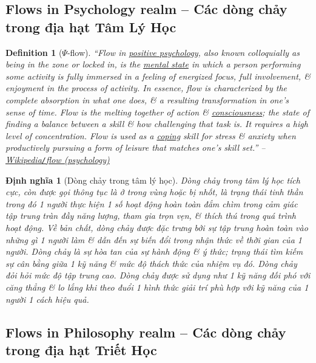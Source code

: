 \documentclass[12pt,oneside]{book}
\newtheorem{definition}{Definition}[section]
\newtheorem{dinhnghia}{Định nghĩa}[section]
\begin{document}
\subsection{Flows in Psychology realm -- Các dòng chảy trong địa hạt Tâm Lý Học}

\begin{definition}[$\Psi$-flow]
	``\emph{Flow} in \href{https://en.wikipedia.org/wiki/Positive_psychology}{positive psychology}, also known colloquially as being \emph{in the zone} or \emph{locked in}, is the \href{https://en.wikipedia.org/wiki/Mental_state}{mental state} in which a person performing some activity is fully immersed in a feeling of energized focus, full involvement, \& enjoyment in the process of activity. In essence, flow is characterized by the complete absorption in what one does, \& a resulting transformation in one's sense of time. Flow is the melting together of action \& \href{https://en.wikipedia.org/wiki/Consciousness}{consciousness}; the state of finding a balance between a skill \& how challenging that task is. It requires a high level of concentration. Flow is used as a \href{https://en.wikipedia.org/wiki/Coping}{coping} skill for stress \& anxiety when productively pursuing a form of leisure  that matches one's skill set.'' -- \href{https://en.wikipedia.org/wiki/Flow_(psychology)}{Wikipedia{\tt/}flow (psychology)}
\end{definition}

\begin{dinhnghia}[Dòng chảy trong tâm lý học]
	\emph{Dòng chảy} trong tâm lý học tích cực, còn được gọi thông tục là \emph{ở trong vùng} hoặc \emph{bị nhốt}, là trạng thái tinh thần trong đó 1 người thực hiện 1 số hoạt động hoàn toàn đắm chìm trong cảm giác tập trung tràn đầy năng lượng, tham gia trọn vẹn, \& thích thú trong quá trình hoạt động. Về bản chất, dòng chảy được đặc trưng bởi sự tập trung hoàn toàn vào những gì 1 người làm \& dẫn đến sự biến đổi trong nhận thức về thời gian của 1 người. Dòng chảy là sự hòa tan của sự hành động \& ý thức; trạng thái tìm kiếm sự cân bằng giữa 1 kỹ năng \& mức độ thách thức của nhiệm vụ đó. Dòng chảy đỏi hỏi mức độ tập trung cao. Dòng chảy được sử dụng như 1 kỹ năng đối phó với căng thẳng \& lo lắng khi theo đuổi 1 hình thức giải trí phù hợp với kỹ năng của 1 người 1 cách hiệu quả. 
\end{dinhnghia}

\subsection{Flows in Philosophy realm -- Các dòng chảy trong địa hạt Triết Học}
\end{document}
